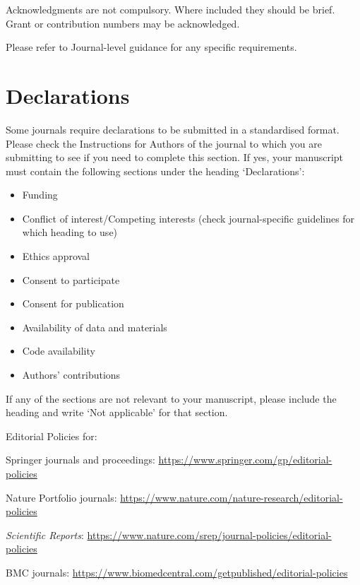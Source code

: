 \documentclass[sn-mathphys]{sn-jnl}%
\theoremstyle{thmstyleone}%
\theoremstyle{thmstyletwo}%
\theoremstyle{thmstylethree}%
\begin{document}
Acknowledgments are not compulsory. Where included they should be brief. Grant or contribution numbers may be acknowledged.

Please refer to Journal-level guidance for any specific requirements.

\section*{Declarations}

Some journals require declarations to be submitted in a standardised format. Please check the Instructions for Authors of the journal to which you are submitting to see if you need to complete this section. If yes, your manuscript must contain the following sections under the heading `Declarations':

\begin{itemize}
\item Funding
\item Conflict of interest/Competing interests (check journal-specific guidelines for which heading to use)
\item Ethics approval 
\item Consent to participate
\item Consent for publication
\item Availability of data and materials
\item Code availability 
\item Authors' contributions
\end{itemize}

\noindent
If any of the sections are not relevant to your manuscript, please include the heading and write `Not applicable' for that section. 

\bigskip
\begin{flushleft}%
Editorial Policies for:

\bigskip\noindent
Springer journals and proceedings: \url{https://www.springer.com/gp/editorial-policies}

\bigskip\noindent
Nature Portfolio journals: \url{https://www.nature.com/nature-research/editorial-policies}

\bigskip\noindent
\textit{Scientific Reports}: \url{https://www.nature.com/srep/journal-policies/editorial-policies}

\bigskip\noindent
BMC journals: \url{https://www.biomedcentral.com/getpublished/editorial-policies}
\end{flushleft}
\end{document}
